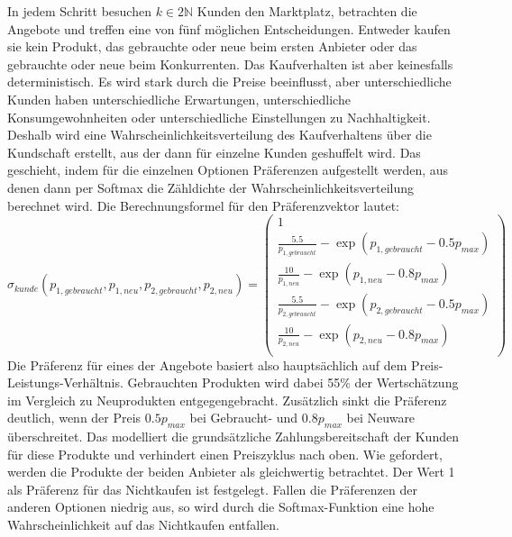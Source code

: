 In jedem Schritt besuchen $k \in 2\mathbb{N}$ Kunden den Marktplatz, betrachten die Angebote und treffen eine von fünf möglichen Entscheidungen.
Entweder kaufen sie kein Produkt, das gebrauchte oder neue beim ersten Anbieter oder das gebrauchte oder neue beim Konkurrenten.
Das Kaufverhalten ist aber keinesfalls deterministisch.
Es wird stark durch die Preise beeinflusst, aber unterschiedliche Kunden haben unterschiedliche Erwartungen, unterschiedliche Konsumgewohnheiten oder unterschiedliche Einstellungen zu Nachhaltigkeit.
Deshalb wird eine Wahrscheinlichkeitsverteilung des Kaufverhaltens über die Kundschaft erstellt, aus der dann für einzelne Kunden geshuffelt wird.
Das geschieht, indem für die einzelnen Optionen Präferenzen aufgestellt werden, aus denen dann per Softmax die Zähldichte der Wahrscheinlichkeitsverteilung berechnet wird.
Die Berechnungsformel für den Präferenzvektor lautet:
\begin{equation}
	\sigma_{kunde}(p_{1, gebraucht}, p_{1, neu}, p_{2, gebraucht}, p_{2, neu}) =
	\begin{pmatrix}
		1\\
		\frac{5.5}{p_{1, gebraucht}} - \exp{(p_{1, gebraucht} - 0.5 p_{max})}\\
		\frac{10}{p_{1, neu}} - \exp{(p_{1, neu} - 0.8 p_{max})}\\
		\frac{5.5}{p_{2, gebraucht}} - \exp{(p_{2, gebraucht} - 0.5 p_{max})}\\
		\frac{10}{p_{2, neu}} - \exp{(p_{2, neu} - 0.8 p_{max})}\\
	\end{pmatrix}
\end{equation}
Die Präferenz für eines der Angebote basiert also hauptsächlich auf dem Preis-Leistungs-Verhältnis.
Gebrauchten Produkten wird dabei 55\% der Wertschätzung im Vergleich zu Neuprodukten entgegengebracht.
Zusätzlich sinkt die Präferenz deutlich, wenn der Preis $0.5 p_{max}$ bei Gebraucht- und $0.8 p_{max}$ bei Neuware überschreitet.
Das modelliert die grundsätzliche Zahlungsbereitschaft der Kunden für diese Produkte und verhindert einen Preiszyklus nach oben.
Wie gefordert, werden die Produkte der beiden Anbieter als gleichwertig betrachtet.
Der Wert 1 als Präferenz für das Nichtkaufen ist festgelegt.
Fallen die Präferenzen der anderen Optionen niedrig aus, so wird durch die Softmax-Funktion eine hohe Wahrscheinlichkeit auf das Nichtkaufen entfallen.

